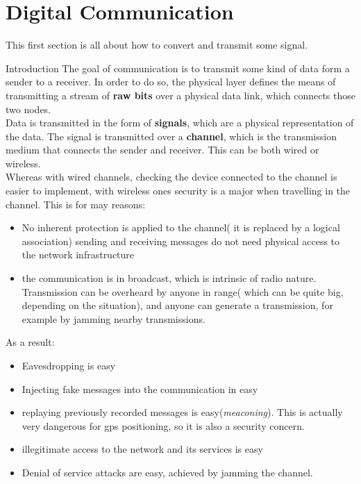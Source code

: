 \chapter{Digital Communication}
This first section is all about how to convert and transmit some signal.\
\begin{section}{Introduction}
\label{sec:intro}
The goal of communication is to transmit some kind of data form a sender to a receiver. In order 
to do so, the physical layer defines the means of transmitting a stream of \textbf{raw bits} over a
physical data link, which connects those two nodes.\\
Data is transmitted in the form of \textbf{signals}, which are a physical representation of the data.
The signal is transmitted over a \textbf{channel}, which is the transmission medium that connects 
the sender and receiver. This can be both wired or wireless.\\
Whereas with wired channels, checking the device connected to the channel is easier to implement, 
with wireless ones security is a major when travelling in the channel. This is for may reasons:
\begin{itemize}
  \item No inherent protection is applied to the channel( it is replaced by a logical association)
     \subitem sending and receiving messages do not need physical access to the network 
     infrastructure
  \item the communication is in broadcast, which is intrinsic of radio nature.
    \subitem Transmission can be overheard by anyone in range( which can be quite big, depending 
    on the situation), and anyone can generate a transmission, for example by jamming nearby 
    transmissions.
\end{itemize}
As a result:
\begin{itemize}
  \item Eavesdropping is easy
  \item Injecting fake messages into the communication in easy
  \item replaying previously recorded messages is easy(\textit{meaconing}). This is actually very 
    dangerous for gps positioning, so it is also a security concern.
  \item illegitimate access to the network and its services is easy
  \item Denial of service attacks are easy, achieved by jamming the channel.
\end{itemize}
\end{section}
